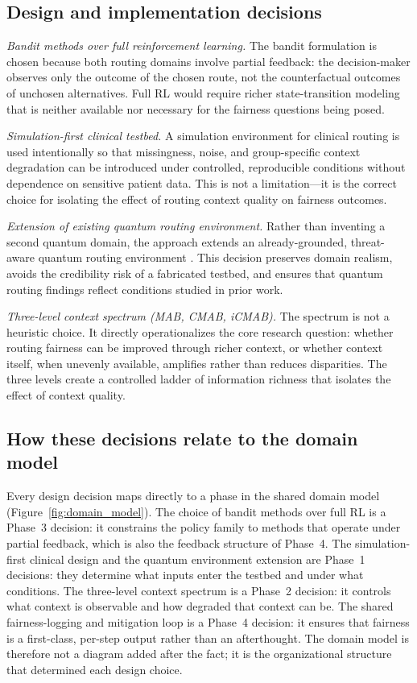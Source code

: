 \documentclass{IEEEtran}
\begin{document}
\subsection{Design and implementation decisions}
\textit{Bandit methods over full reinforcement learning.} The bandit
formulation is chosen because both routing domains involve partial feedback:
the decision-maker observes only the outcome of the chosen route, not the
counterfactual outcomes of unchosen alternatives. Full RL would require
richer state-transition modeling that is neither available nor necessary for
the fairness questions being posed.

\textit{Simulation-first clinical testbed.} A simulation environment for
clinical routing is used intentionally so that missingness, noise, and
group-specific context degradation can be introduced under controlled,
reproducible conditions without dependence on sensitive patient data. This
is not a limitation---it is the correct choice for isolating the effect of
routing context quality on fairness outcomes.

\textit{Extension of existing quantum routing environment.} Rather than
inventing a second quantum domain, the approach extends an already-grounded,
threat-aware quantum routing environment
\cite{garcia2026threat_aware_quantum_routing}. This decision preserves
domain realism, avoids the credibility risk of a fabricated testbed, and
ensures that quantum routing findings reflect conditions studied in prior
work.

\textit{Three-level context spectrum (MAB, CMAB, iCMAB).} The spectrum is
not a heuristic choice. It directly operationalizes the core research
question: whether routing fairness can be improved through richer context, or
whether context itself, when unevenly available, amplifies rather than
reduces disparities. The three levels create a controlled ladder of
information richness that isolates the effect of context quality.

\subsection{How these decisions relate to the domain model}
Every design decision maps directly to a phase in the shared domain model
(Figure~\ref{fig:domain_model}). The choice of bandit methods over full RL
is a Phase~3 decision: it constrains the policy family to methods that
operate under partial feedback, which is also the feedback structure of
Phase~4. The simulation-first clinical design and the quantum environment
extension are Phase~1 decisions: they determine what inputs enter the
testbed and under what conditions. The three-level context spectrum is a
Phase~2 decision: it controls what context is observable and how degraded
that context can be. The shared fairness-logging and mitigation loop is a
Phase~4 decision: it ensures that fairness is a first-class, per-step
output rather than an afterthought. The domain model is therefore not a
diagram added after the fact; it is the organizational structure that
determined each design choice.
\end{document}
